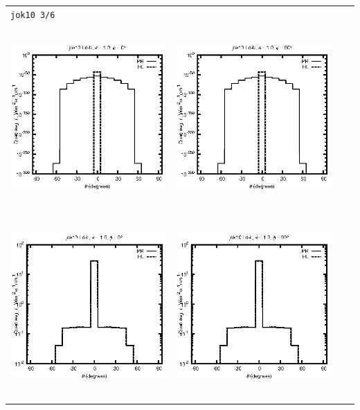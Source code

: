 \documentclass[10pt,a4paper]{article}
\begin{document}
\begin{adjustwidth}{-1.2in}{-1.2in}
\begin{tabular}{c c c c}
\multicolumn{4}{l}{\texttt{jok10 3/6}} \\
\includegraphics[height=7cm]{../eps/jok10_Ld_b_fwd.eps} &
\includegraphics[height=7cm]{../eps/jok10_Ld_b_cross.eps} \\
\includegraphics[height=7cm]{../eps/jok10_Ld_it_fwd.eps} &
\includegraphics[height=7cm]{../eps/jok10_Ld_it_cross.eps} \\

\end{tabular}
\end{adjustwidth}
\end{document}
